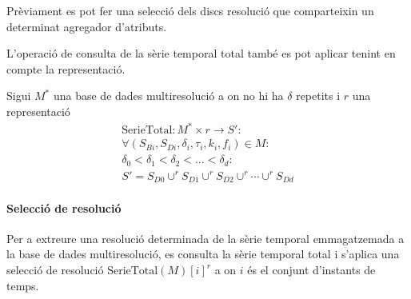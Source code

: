 Prèviament es pot fer una selecció dels discs resolució que
comparteixin un determinat agregador d'atributs. 



L'operació de consulta de la sèrie temporal total també es pot aplicar
tenint en compte la representació.
\begin{definition}
  Sigui $M^*$ una base de dades multiresolució a on no hi ha $\delta$
  repetits i $r$ una representació
  \begin{gather*}
    \text{SerieTotal}: M^* \times r \longrightarrow S': \\
    \forall (S_{Bi},S_{Di},\delta_i,\tau_i,k_i,f_i) \in M : \\
    \delta_0 < \delta_1 < \delta_2 < \dots < \delta_d : \\
    S' = S_{D0} \cup^r S_{D1} \cup^r  S_{D2}  \cup^r \dotsb \cup^r  S_{Dd}
\end{gather*}
\end{definition}



\paragraph{Selecció de resolució}


Per a extreure una resolució determinada de la sèrie temporal
emmagatzemada a la base de dades multiresolució, es consulta la sèrie
temporal total i s'aplica una selecció de resolució
$\text{SerieTotal}(M)[i]^r$ a on $i$ és el conjunt d'instants de
temps.






